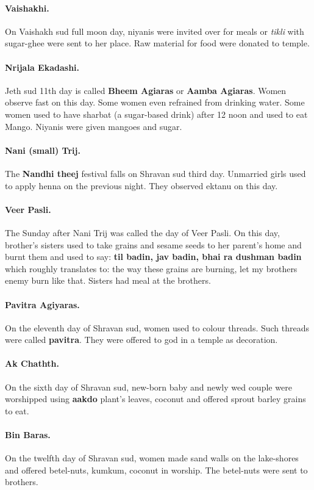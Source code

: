 \paragraph{Vaishakhi.} On Vaishakh sud full moon day, niyanis were invited over
for meals or \textit{tikli} with sugar-ghee were sent to her place. Raw material for food
were donated to temple.
\paragraph{Nrijala Ekadashi.} Jeth sud 11th day is called \textbf{Bheem Agiaras}
or \textbf{Aamba Agiaras}. Women observe fast on this day. Some women even
refrained from drinking water. Some women used to have sharbat (a sugar-based
drink) after 12 noon and used to eat Mango. Niyanis were given mangoes and
sugar. 
\paragraph{Nani (small) Trij.} The \textbf{Nandhi theej} festival falls on Shravan sud
third day. Unmarried girls used to apply henna on the previous night. They
observed ektanu on this day.
\paragraph{Veer Pasli.} The Sunday after Nani Trij was called the day of Veer
Pasli. On this day, brother's sisters used to take grains and sesame seeds to
her parent's home and burnt them and used to say: \textbf{til badin, jav badin,
bhai ra dushman badin} which roughly translates to: the way these grains are
burning, let my brothers enemy burn like that. Sisters had meal at the brothers.
\paragraph{Pavitra Agiyaras.} On the eleventh day of Shravan sud, women used to
colour threads. Such threads were called \textbf{pavitra}. They were offered to
god in a temple as decoration.
\paragraph{Ak Chathth.} On the sixth day of Shravan sud, new-born baby and newly
wed couple were worshipped using \textbf{aakdo} plant's leaves, coconut and offered
sprout barley grains to eat.
\paragraph{Bin Baras.} On the twelfth day of Shravan sud, women made sand walls
on the lake-shores and offered betel-nuts, kumkum, coconut in worship. The
betel-nuts were sent to brothers.
